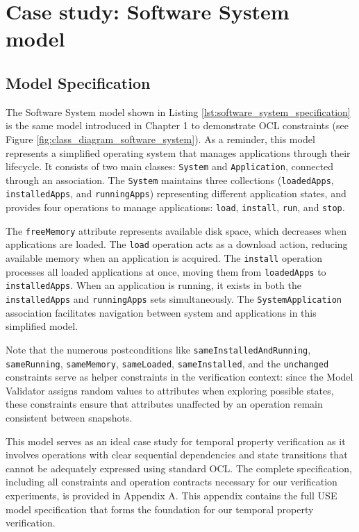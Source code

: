 \section{Case study: Software System model}
\label{sec:case_study_software_system}

\subsection{Model Specification}

\hspace{1cm} The Software System model shown in Listing \ref{lst:software_system_specification} 
is the same model introduced in Chapter 1 to demonstrate OCL constraints (see 
Figure \ref{fig:class_diagram_software_system}). As a reminder, this model represents 
a simplified operating system that manages applications through their lifecycle. 
It consists of two main classes: \texttt{System} and \texttt{Application}, connected 
through an association. The \texttt{System} maintains three collections 
(\texttt{loadedApps}, \texttt{installedApps}, and \texttt{runningApps}) representing 
different application states, and provides four operations to manage applications: 
\texttt{load}, \texttt{install}, \texttt{run}, and \texttt{stop}.

The \texttt{freeMemory} attribute represents available disk space, which decreases 
when applications are loaded. The \texttt{load} operation acts as a download action, 
reducing available memory when an application is acquired. The \texttt{install} 
operation processes all loaded applications at once, moving them from 
\texttt{loadedApps} to \texttt{installedApps}. When an application is running, it 
exists in both the \texttt{installedApps} and \texttt{runningApps} sets simultaneously. 
The \texttt{SystemApplication} association facilitates navigation between system and 
applications in this simplified model.

Note that the numerous postconditions like \texttt{sameInstalledAndRunning}, 
\texttt{sameRunning}, \texttt{sameMemory}, \texttt{sameLoaded}, \texttt{sameInstalled}, 
and the \texttt{unchanged} constraints serve as helper constraints in the verification 
context: since the Model Validator assigns random values to attributes when exploring 
possible states, these constraints ensure that attributes unaffected by an operation 
remain consistent between snapshots.

This model serves as an ideal case study for temporal property verification as it 
involves operations with clear sequential dependencies and state transitions that 
cannot be adequately expressed using standard OCL. The complete specification, 
including all constraints and operation contracts necessary for our verification 
experiments, is provided in Appendix A. This appendix contains the full USE model 
specification that forms the foundation for our temporal property verification.

